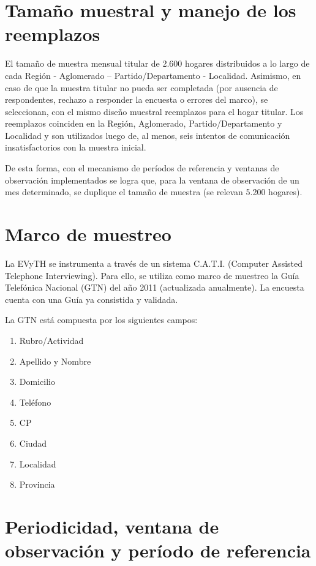 \documentclass[
  openany]{book}
\begin{document}
\hypertarget{tamauxf1o-muestral-y-manejo-de-los-reemplazos}{%
\section{Tamaño muestral y manejo de los reemplazos}\label{tamauxf1o-muestral-y-manejo-de-los-reemplazos}}

El tamaño de muestra mensual titular de 2.600 hogares distribuidos a lo largo de cada Región - Aglomerado -- Partido/Departamento - Localidad. Asimismo, en caso de que la muestra titular no pueda ser completada (por ausencia de respondentes, rechazo a responder la encuesta o errores del marco), se seleccionan, con el mismo diseño muestral reemplazos para el hogar titular. Los reemplazos coinciden en la Región, Aglomerado, Partido/Departamento y Localidad y son utilizados luego de, al menos, seis intentos de comunicación insatisfactorios con la muestra inicial.

De esta forma, con el mecanismo de períodos de referencia y ventanas de observación implementados se logra que, para la ventana de observación de un mes determinado, se duplique el tamaño de muestra (se relevan 5.200 hogares).

\hypertarget{marco-de-muestreo}{%
\section{Marco de muestreo}\label{marco-de-muestreo}}

La EVyTH se instrumenta a través de un sistema C.A.T.I. (Computer Assisted Telephone Interviewing). Para ello, se utiliza como marco de muestreo la Guía Telefónica Nacional (GTN) del año 2011 (actualizada anualmente). La encuesta cuenta con una Guía ya consistida y validada.

La GTN está compuesta por los siguientes campos:

\begin{enumerate}
\def\labelenumi{\arabic{enumi}.}
\item
  Rubro/Actividad
\item
  Apellido y Nombre
\item
  Domicilio
\item
  Teléfono
\item
  CP
\item
  Ciudad
\item
  Localidad
\item
  Provincia
\end{enumerate}

\hypertarget{periodicidad-ventana-de-observaciuxf3n-y-peruxedodo-de-referencia}{%
\section{Periodicidad, ventana de observación y período de referencia}\label{periodicidad-ventana-de-observaciuxf3n-y-peruxedodo-de-referencia}}
\end{document}
